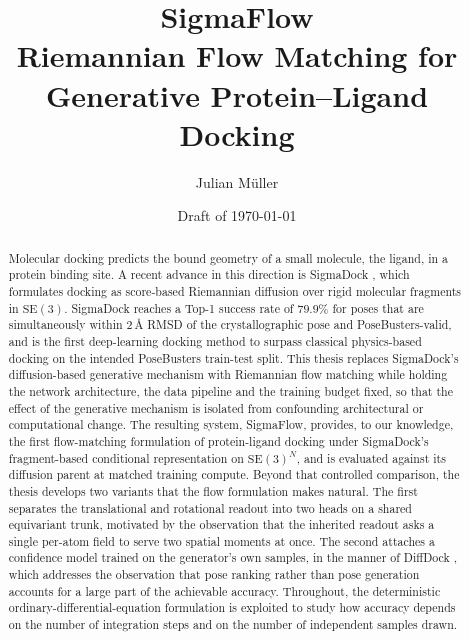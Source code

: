 \documentclass[11pt,a4paper]{report}
\title{\textbf{SigmaFlow}\\[0.3em]
       \large Riemannian Flow Matching for Generative Protein--Ligand Docking}
\author{Julian M\"uller}
\date{Draft of \today}
\theoremstyle{plain}
\theoremstyle{definition}
\theoremstyle{remark}
\newif\ifdraftmode
\newcommand{\dnote}[2]{\ifdraftmode{\sffamily\small\color{DraftBlue}\textbf{[#1]}\ #2}\fi}
\newcommand{\SEthree}{\mathrm{SE}(3)}
\begin{document}
\maketitle

\begin{abstract}
\noindent
Molecular docking predicts the bound geometry of a small molecule, the ligand,
in a protein binding site. A recent advance in this direction is SigmaDock
\citep{prat2026sigmadock}, which formulates docking as score-based Riemannian
diffusion over rigid molecular fragments in $\SEthree$. SigmaDock reaches a
Top-1 success rate of $79.9\%$ for poses that are simultaneously within
$2$\,\AA{} RMSD of the crystallographic pose and PoseBusters-valid, and is the
first deep-learning docking method to surpass classical physics-based docking
on the intended PoseBusters train-test split. This thesis replaces SigmaDock's
diffusion-based generative mechanism with Riemannian flow matching while
holding the network architecture, the data pipeline and the training budget
fixed, so that the effect of the generative mechanism is isolated from
confounding architectural or computational change. The resulting system,
SigmaFlow, provides, to our knowledge, the first flow-matching formulation of
protein-ligand docking under SigmaDock's fragment-based conditional
representation on $\SEthree^{N}$, and is evaluated against its diffusion
parent at matched training compute. Beyond that controlled comparison, the
thesis develops two variants that the flow formulation makes natural. The
first separates the translational and rotational readout into two heads on a
shared equivariant trunk, motivated by the observation that the inherited
readout asks a single per-atom field to serve two spatial moments at once. The
second attaches a confidence model trained on the generator's own samples, in
the manner of DiffDock \citep{corso2023diffdock}, which addresses the
observation that pose ranking rather than pose generation accounts for a large
part of the achievable accuracy. Throughout, the deterministic
ordinary-differential-equation formulation is exploited to study how accuracy
depends on the number of integration steps and on the number of independent
samples drawn.
\\\\
\dnote{RESULT PENDING}{The abstract closes with the verdict of the
matched-compute experiments and of the two variants. Rewrite the final two
sentences once Chapters~\ref{ch:minimal}, \ref{ch:separate} and
\ref{ch:confidence} carry their results.}
\end{abstract}
\end{document}
